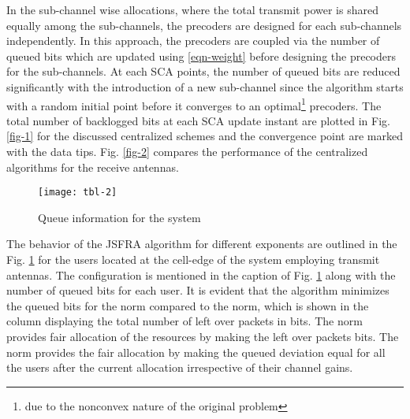 In the sub-channel wise allocations, where the total transmit power is shared equally among the sub-channels, the precoders are designed for each sub-channels independently. In this approach, the precoders are coupled via the number of queued bits which are updated using \eqref{eqn-weight} before designing the precoders for the sub-channels. At each \ac{SCA} points, the number of queued bits are reduced significantly with the introduction of a new sub-channel since the algorithm starts with a random initial point before it converges to an optimal\footnote{due to the nonconvex nature of the original problem} precoders. The total number of backlogged bits at each \ac{SCA} update instant are plotted in Fig. \ref{fig-1} for the discussed centralized schemes and the convergence point are marked with the data tips. Fig. \ref{fig-2} compares the performance of the centralized algorithms for the  receive antennas.
\begin{figure}
\centering
\texttt{[image: tbl-2]}
\caption{Queue information for the system }
\label{tbl-3}
\end{figure}

The behavior of the \ac{JSFRA} algorithm for different exponents  are outlined in the Fig. \ref{tbl-3} for the users located at the cell-edge of the system employing  transmit antennas. The configuration is mentioned in the caption of Fig. \ref{tbl-3} along with the number of queued bits for each user. It is evident that the algorithm minimizes the queued bits for the  norm compared to the  norm, which is shown in the column displaying the total number of left over packets \me{\chi} in bits. The \me{\ell_{\infty}} norm provides fair allocation of the resources by making the left over packets  bits. The \me{\ell_{\infty}} norm provides the fair allocation by making the queued deviation equal for all the users after the current allocation irrespective of their channel gains.
